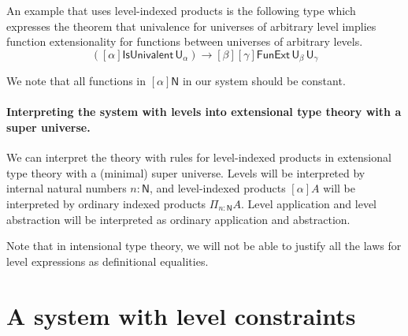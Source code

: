 \documentclass[11pt,a4paper]{article}
\def\NN{\mathsf{N}}
\def\UU{\mathsf{U}}
\begin{document}
An example that uses level-indexed products is the following type which  expresses the theorem that univalence for universes of arbitrary level implies function extensionality for functions between universes of arbitrary levels.
$$
([\alpha]\mathsf{IsUnivalent}\, \UU_\alpha)
\to [\beta][\gamma] \mathsf{FunExt}\, \UU_\beta\, \UU_\gamma
$$   
               
We note that all functions in $[\alpha]\NN$ in our system
should be constant. 

\paragraph{Interpreting the system with levels into extensional type theory with a super universe.} We can interpret the theory with rules for level-indexed products in extensional type theory with a (minimal) super universe. Levels will be interpreted by internal natural numbers $n : \NN$, and level-indexed products $[\alpha]A$ will be interpreted by ordinary indexed products $\Pi_{n : \NN}A$. Level application and level abstraction will be interpreted as ordinary application and abstraction.

Note that in intensional type theory, we will not be able to justify all the laws for level expressions as definitional equalities.

\section{A system with level constraints}\label{constraints}
\end{document}
